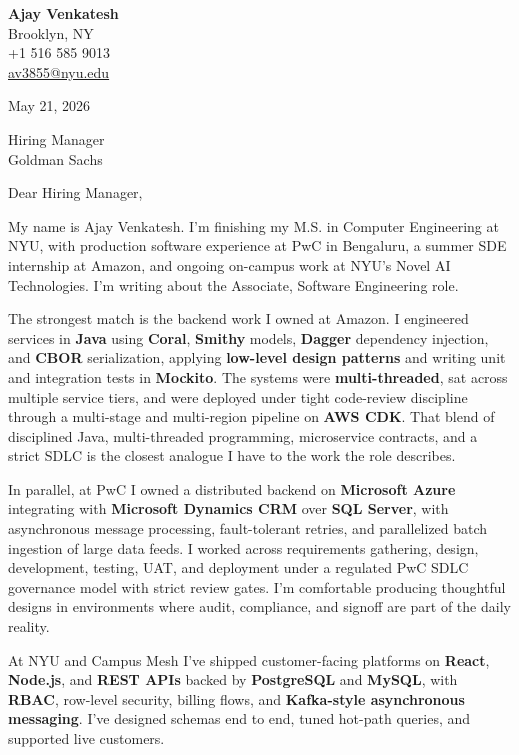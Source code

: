 \documentclass[letterpaper,11pt]{article}
\begin{document}
\begin{flushleft}
\textbf{\large Ajay Venkatesh} \\
Brooklyn, NY \\
+1 516 585 9013 \\
\href{mailto:av3855@nyu.edu}{av3855@nyu.edu}
\end{flushleft}
\vspace{10pt}
May 21, 2026
\vspace{6pt}

Hiring Manager \\
Goldman Sachs

\vspace{10pt}

Dear Hiring Manager,

My name is Ajay Venkatesh. I'm finishing my M.S. in Computer Engineering at NYU, with production software experience at PwC in Bengaluru, a summer SDE internship at Amazon, and ongoing on-campus work at NYU's Novel AI Technologies. I'm writing about the Associate, Software Engineering role.

The strongest match is the backend work I owned at Amazon. I engineered services in \textbf{Java} using \textbf{Coral}, \textbf{Smithy} models, \textbf{Dagger} dependency injection, and \textbf{CBOR} serialization, applying \textbf{low-level design patterns} and writing unit and integration tests in \textbf{Mockito}. The systems were \textbf{multi-threaded}, sat across multiple service tiers, and were deployed under tight code-review discipline through a multi-stage and multi-region pipeline on \textbf{AWS CDK}. That blend of disciplined Java, multi-threaded programming, microservice contracts, and a strict SDLC is the closest analogue I have to the work the role describes.

In parallel, at PwC I owned a distributed backend on \textbf{Microsoft Azure} integrating with \textbf{Microsoft Dynamics CRM} over \textbf{SQL Server}, with asynchronous message processing, fault-tolerant retries, and parallelized batch ingestion of large data feeds. I worked across requirements gathering, design, development, testing, UAT, and deployment under a regulated PwC SDLC governance model with strict review gates. I'm comfortable producing thoughtful designs in environments where audit, compliance, and signoff are part of the daily reality.

At NYU and Campus Mesh I've shipped customer-facing platforms on \textbf{React}, \textbf{Node.js}, and \textbf{REST APIs} backed by \textbf{PostgreSQL} and \textbf{MySQL}, with \textbf{RBAC}, row-level security, billing flows, and \textbf{Kafka-style asynchronous messaging}. I've designed schemas end to end, tuned hot-path queries, and supported live customers.
\end{document}
